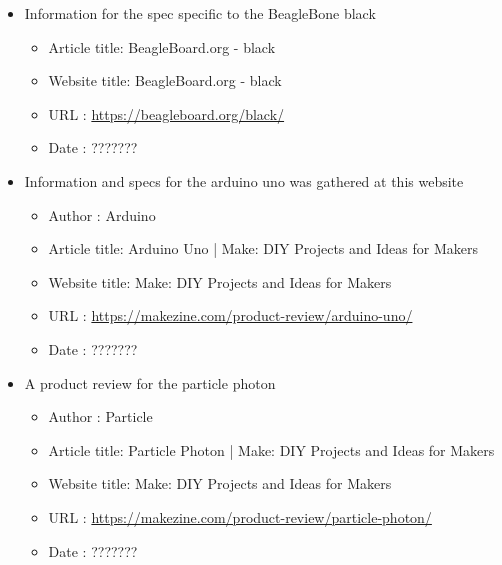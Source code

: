 \documentclass{article}
\begin{document}
\begin{thebibliography}{56}
\begin{itemize}
        \item Information for the spec specific to the BeagleBone black
        \begin{itemize}
            \item Article title: BeagleBoard.org - black
            \item Website title: BeagleBoard.org - black
            \item URL          : \url{https://beagleboard.org/black/}
            \item Date         : ???????
        \end{itemize}

    \end{itemize}

    \begin{itemize}
        \item Information and specs for the arduino uno was gathered at this website
        \begin{itemize}
            \item Author       : Arduino
            \item Article title: Arduino Uno | Make: DIY Projects and Ideas for Makers
            \item Website title: Make: DIY Projects and Ideas for Makers
            \item URL          : \url{https://makezine.com/product-review/arduino-uno/}
            \item Date         : ???????
        \end{itemize}
    \end{itemize}

    \begin{itemize}
        \item A product review for the particle photon
        \begin{itemize}
            \item Author       : Particle
            \item Article title: Particle Photon | Make: DIY Projects and Ideas for Makers
            \item Website title: Make: DIY Projects and Ideas for Makers
            \item URL          : \url{https://makezine.com/product-review/particle-photon/}
            \item Date         : ???????
        \end{itemize}


\end{itemize}
\end{thebibliography}
\end{document}
